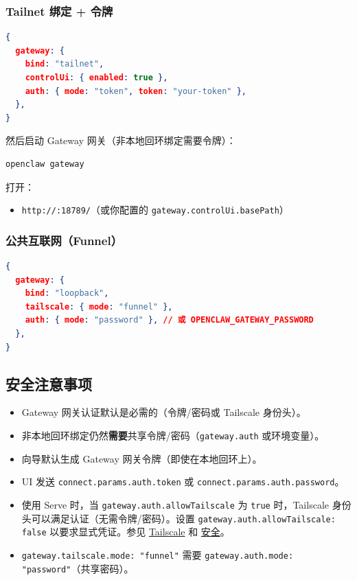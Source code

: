 \subsubsection{Tailnet 绑定 + 令牌}


\begin{lstlisting}[language=json]
{
  gateway: {
    bind: "tailnet",
    controlUi: { enabled: true },
    auth: { mode: "token", token: "your-token" },
  },
}
\end{lstlisting}


然后启动 Gateway 网关（非本地回环绑定需要令牌）：

\begin{lstlisting}[language=bash]
openclaw gateway
\end{lstlisting}


打开：

\begin{itemize}
  \item \texttt{http://:18789/}（或你配置的 \texttt{gateway.controlUi.basePath}）
\end{itemize}


\subsubsection{公共互联网（Funnel）}


\begin{lstlisting}[language=json]
{
  gateway: {
    bind: "loopback",
    tailscale: { mode: "funnel" },
    auth: { mode: "password" }, // 或 OPENCLAW_GATEWAY_PASSWORD
  },
}
\end{lstlisting}


\subsection{安全注意事项}


\begin{itemize}
  \item Gateway 网关认证默认是必需的（令牌/密码或 Tailscale 身份头）。
  \item 非本地回环绑定仍然\textbf{需要}共享令牌/密码（\texttt{gateway.auth} 或环境变量）。
  \item 向导默认生成 Gateway 网关令牌（即使在本地回环上）。
  \item UI 发送 \texttt{connect.params.auth.token} 或 \texttt{connect.params.auth.password}。
  \item 使用 Serve 时，当 \texttt{gateway.auth.allowTailscale} 为 \texttt{true} 时，Tailscale 身份头可以满足认证（无需令牌/密码）。设置 \texttt{gateway.auth.allowTailscale: false} 以要求显式凭证。参见 \href{/gateway/tailscale}{Tailscale} 和 \href{/gateway/security}{安全}。
  \item \texttt{gateway.tailscale.mode: "funnel"} 需要 \texttt{gateway.auth.mode: "password"}（共享密码）。
\end{itemize}


